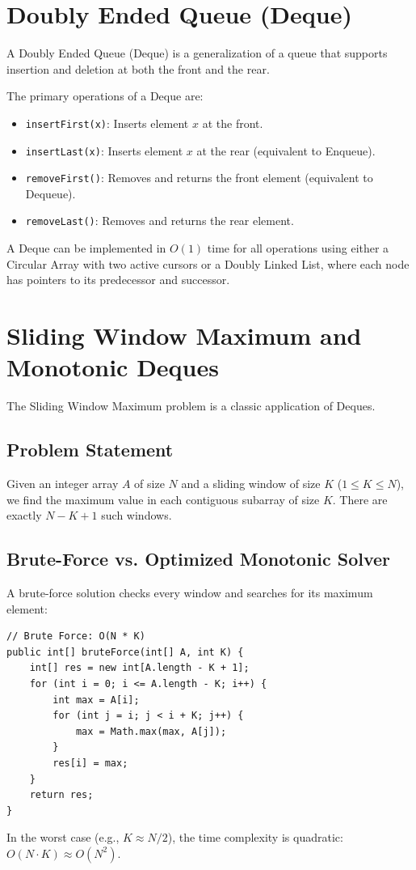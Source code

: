 \documentclass[10pt,journal,compsoc,onecolumn]{IEEEtran}
\begin{document}
\section{Doubly Ended Queue (Deque)}
\label{sec:deque}
A Doubly Ended Queue (Deque) is a generalization of a queue that supports insertion and deletion at both the front and the rear. 

The primary operations of a Deque are:
\begin{itemize}
    \item \texttt{insertFirst(x)}: Inserts element $x$ at the front.
    \item \texttt{insertLast(x)}: Inserts element $x$ at the rear (equivalent to Enqueue).
    \item \texttt{removeFirst()}: Removes and returns the front element (equivalent to Dequeue).
    \item \texttt{removeLast()}: Removes and returns the rear element.
\end{itemize}

A Deque can be implemented in $O(1)$ time for all operations using either a Circular Array with two active cursors or a Doubly Linked List, where each node has pointers to its predecessor and successor.

\section{Sliding Window Maximum and Monotonic Deques}
\label{sec:sliding_window}
The Sliding Window Maximum problem is a classic application of Deques.

\subsection{Problem Statement}
Given an integer array $A$ of size $N$ and a sliding window of size $K$ ($1 \le K \le N$), we find the maximum value in each contiguous subarray of size $K$. There are exactly $N - K + 1$ such windows.

\subsection{Brute-Force vs. Optimized Monotonic Solver}
A brute-force solution checks every window and searches for its maximum element:
\begin{verbatim}
// Brute Force: O(N * K)
public int[] bruteForce(int[] A, int K) {
    int[] res = new int[A.length - K + 1];
    for (int i = 0; i <= A.length - K; i++) {
        int max = A[i];
        for (int j = i; j < i + K; j++) {
            max = Math.max(max, A[j]);
        }
        res[i] = max;
    }
    return res;
}
\end{verbatim}
In the worst case (e.g., $K \approx N/2$), the time complexity is quadratic: $O(N \cdot K) \approx O(N^2)$.
\end{document}
